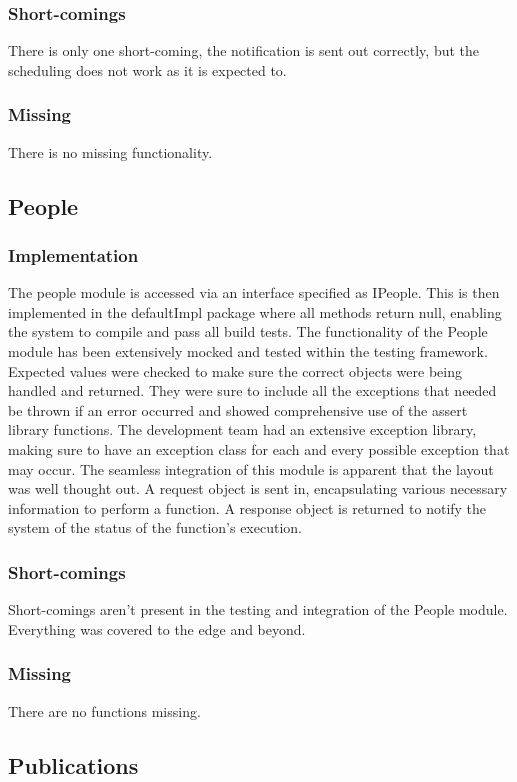 \documentclass{article}
\begin{document}
        \subsubsection{Short-comings}
        There is only one short-coming, the notification is sent out correctly, but the scheduling does not work as it is expected to. 
        \subsubsection{Missing}
        There is no missing functionality.
        
    \subsection{People}
        \subsubsection{Implementation}
		The people module is accessed via an interface specified as IPeople. This is then implemented in the defaultImpl package where all methods return null, enabling the system to compile and pass all build tests. The functionality of the People module has been extensively mocked and tested within the testing framework. Expected values were checked to make sure the correct objects were being handled and returned. They were sure to include all the exceptions that needed be thrown if an error occurred and showed comprehensive use of the assert library functions. The development team had an extensive exception library, making sure to have an exception class for each and every possible exception that may occur. The seamless integration of this module is apparent that the layout was well thought out. A request object is sent in, encapsulating various necessary information to perform a function. A response object is returned to notify the system of the status of the function's execution.
		\subsubsection{Short-comings}
		Short-comings aren't present in the testing and integration of the People module. Everything was covered to the edge and beyond.
		\subsubsection{Missing}
		There are no functions missing.
		
	\subsection{Publications}
\end{document}
